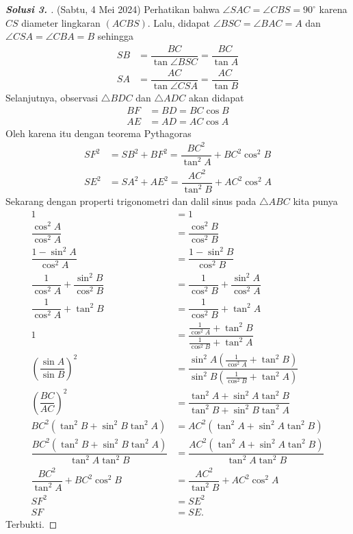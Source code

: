 \begin{proof}[\textbf{Solusi 3. }] (Sabtu, 4 Mei 2024) 
Perhatikan bahwa $\angle SAC = \angle CBS = 90^\circ$ karena $CS$ diameter lingkaran $(ACBS)$. Lalu, didapat $\angle BSC = \angle BAC = A$ dan $\angle CSA = \angle CBA = B$ sehingga
\begin{align*}
    SB &= \dfrac{BC}{\tan \angle BSC} = \dfrac{BC}{\tan A}\\
    SA &= \dfrac{AC}{\tan \angle CSA} = \dfrac{AC}{\tan B}
\end{align*}
Selanjutnya, observasi $\triangle BDC$ dan $\triangle ADC$ akan didapat
\begin{align*}
    BF &= BD = BC \cos B\\
    AE &= AD = AC \cos A
\end{align*}
Oleh karena itu dengan teorema Pythagoras
\begin{align*}
    SF^2 &= SB^2 + BF^2 = \dfrac{BC^2}{\tan^2 A} + BC^2 \cos^2 B\\
    SE^2 &= SA^2 + AE^2 = \dfrac{AC^2}{\tan^2 B} + AC^2 \cos^2 A
\end{align*}
Sekarang dengan properti trigonometri dan dalil sinus pada $\triangle ABC$ kita punya
\begin{align*}
    1 &= 1\\
    \dfrac{\cos^2 A}{\cos^2 A} &= \dfrac{\cos^2 B}{\cos^2 B}\\
    \dfrac{1-\sin^2 A}{\cos^2 A} &= \dfrac{1-\sin^2 B}{\cos^2 B}\\
    \dfrac{1}{\cos^2 A}+\dfrac{\sin^2 B}{\cos^2 B} &= \dfrac{1}{\cos^2 B}+\dfrac{\sin^2 A}{\cos^2 A}\\
    \dfrac{1}{\cos^2 A}+\tan^2 B &= \dfrac{1}{\cos^2 B}+\tan^2 A\\
    1 &= \dfrac{\frac{1}{\cos^2 A}+\tan^2 B}{\frac{1}{\cos^2 B}+\tan^2 A}\\
    \left(\dfrac{\sin A}{\sin B}\right)^2 &= \dfrac{\sin^2 A\left(\frac{1}{\cos^2 A}+\tan^2 B\right)}{\sin^2 B\left(\frac{1}{\cos^2 B}+\tan^2 A\right)}\\
    \left(\dfrac{BC}{AC}\right)^2 &= \dfrac{\tan^2 A + \sin^2 A \tan^2 B}{\tan^2 B + \sin^2 B \tan^2 A}\\
    BC^2(\tan^2 B + \sin^2 B \tan^2 A) &= AC^2(\tan^2 A + \sin^2 A \tan^2 B)\\
    \dfrac{BC^2(\tan^2 B + \sin^2 B \tan^2 A)}{\tan^2 A \tan^2 B} &= \dfrac{AC^2(\tan^2 A + \sin^2 A \tan^2 B)}{\tan^2 A \tan^2 B}\\
    \dfrac{BC^2}{\tan^2 A} + BC^2 \cos^2 B &= \dfrac{AC^2}{\tan^2 B} + AC^2 \cos^2 A\\
    SF^2 &= SE^2\\
    SF &= SE.
\end{align*}
Terbukti.
\end{proof}